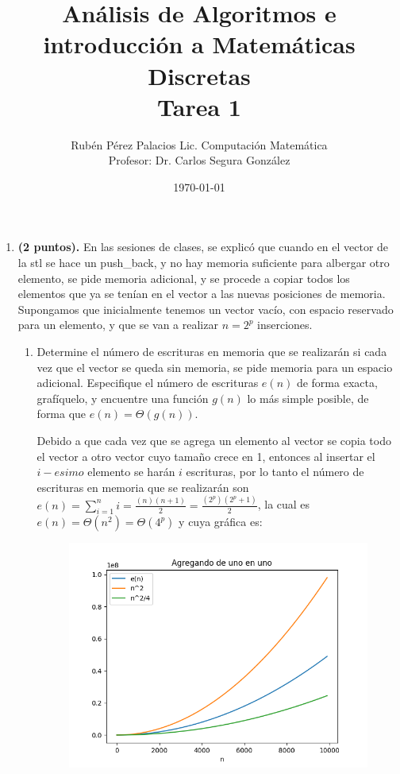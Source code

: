 \documentclass[letterpaper]{article}
\title{Análisis de Algoritmos e introducción a Matemáticas Discretas \\ Tarea 1}
\author{Rubén Pérez Palacios Lic. Computación Matemática\\Profesor: Dr. Carlos Segura González}
\date{\today}
\theoremstyle{definition}
\theoremstyle{lemathm}
\theoremstyle{lemathm}
\theoremstyle{lemathm}
\theoremstyle{lemademthm}
\newcommand{\pars}[1]{\left( #1 \right) }
\newcommand{\1}{\mathbbm{1}}
\begin{document}
	\maketitle

    \begin{enumerate}[label=\textbf{Problema \arabic*}]
        \item \textbf{(2 puntos).} En las sesiones de clases, se explicó que cuando en el vector de la stl se hace un push\_back, y no hay memoria suficiente para albergar otro elemento, se pide memoria adicional, y se procede a copiar todos los elementos que ya se tenían en el vector a las nuevas posiciones de memoria. Supongamos que inicialmente tenemos un vector vacío, con espacio reservado para un elemento, y que se van a realizar $n = 2^p$ inserciones.
        
        \begin{enumerate}
            \item Determine el número de escrituras en memoria que se realizarán si cada vez que el vector se queda sin memoria, se pide memoria para un espacio adicional. Especifique el número de escrituras $e\pars{n}$ de forma exacta, grafíquelo, y encuentre una función $g\pars{n}$ lo más simple posible, de forma que $e\pars{n} = \Theta\pars{g\pars{n}}$.
            
			Debido a que cada vez que se agrega un elemento al vector se copia todo el vector a otro vector cuyo tamaño crece en 1, entonces al insertar el $i-esimo$ elemento se harán $i$ escrituras, por lo tanto el número de escrituras en memoria que se realizarán son $e\pars{n} = \sum_{i=1}^n i = \frac{\pars{n}\pars{n+1}}{2} = \frac{\pars{2^{p}}\pars{2^{p}+1}}{2}$, la cual es $e\pars{n} = \Theta(n^{2}) = \Theta(4^{p})$ y cuya gráfica es:

			\begin{figure}[H]
				\begin{center}
					\includegraphics[scale=0.8]{Images/Agregando_de_uno_en_uno.png}
				\end{center}
			\end{figure}


\end{enumerate}
\end{enumerate}
\end{document}
